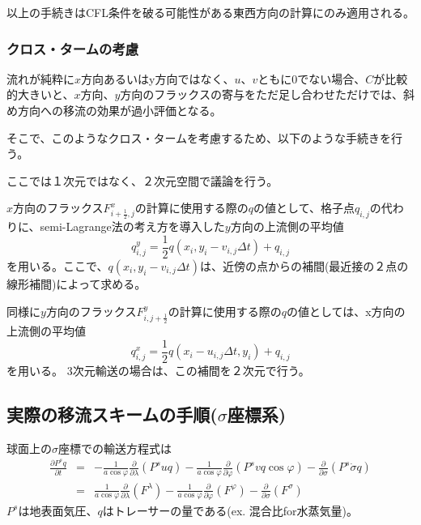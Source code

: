 \documentclass{jsbook}
\begin{document}
  以上の手続きはCFL条件を破る可能性がある東西方向の計算にのみ適用される。

  \subsubsection{クロス・タームの考慮}
  流れが純粋に$x$方向あるいはy方向ではなく、$u、v$ともに0でない場合、$C$が比較的大きいと、$x$方向、$y$方向のフラックスの寄与をただ足し合わせただけでは、斜め方向への移流の効果が過小評価となる。

  そこで、このようなクロス・タームを考慮するため、以下のような手続きを行う。

  ここでは１次元ではなく、２次元空間で議論を行う。
  
  $x$方向のフラックス$F^{x}_{i+\frac{1}{2},j}$の計算に使用する際の$q$の値として、格子点$q_{i,j}$の代わりに、semi-Lagrange法の考え方を導入した$y$方向の上流側の平均値
  \begin{equation}
    q^{y}_{i,j}=\frac{1}{2} {q(x_{i},y_{i}-v_{i,j}\Delta t)+q_{i,j}}
  \end{equation}
  を用いる。ここで、$q(x_{i},y_{i}-v_{i,j}\Delta t)$は、近傍の点からの補間(最近接の２点の線形補間)によって求める。

  同様に$y$方向のフラックス$F^{y}_{i,j+\frac{1}{2}}$の計算に使用する際の$q$の値としては、x方向の上流側の平均値
  \begin{equation}
    q^{x}_{i,j}=\frac{1}{2} {q(x_{i}-u_{i,j}\Delta t,y_{i})+q_{i,j}}
  \end{equation}
  を用いる。
  3次元輸送の場合は、この補間を２次元で行う。

  
  \subsection{実際の移流スキームの手順($\sigma$座標系)}
球面上の$\sigma$座標での輸送方程式は
\begin{eqnarray}
  \label{b1}
  \frac{\partial P^{s} q}{\partial t} &=& - \frac{1}{a \cos \varphi} \frac{\partial}{\partial \lambda}(P^{s} uq)- \frac{1}{a \cos \varphi} \frac{\partial}{\partial \varphi}(P^{s} vq \cos \varphi)- \frac{\partial}{\partial \sigma} (P^{s} \dot{\sigma} q)\\
  &=& \frac{1}{a \cos \varphi} \frac{\partial}{\partial \lambda}(F^{\lambda})- \frac{1}{a \cos \varphi} \frac{\partial}{\partial \varphi}(F^{\varphi})- \frac{\partial}{\partial \sigma} (F^{\sigma})
\end{eqnarray}
$P^{s}$は地表面気圧、$q$はトレーサーの量である(ex. 混合比for水蒸気量)。
\end{document}
